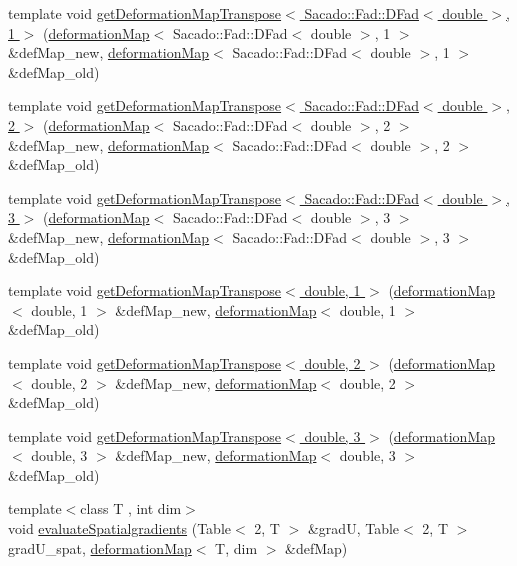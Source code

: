 \begin{DoxyCompactItemize}
\item 
template void \hyperlink{function_evaluations_8cc_a57b94bf3e5309492433be576f3e57c03}{get\-Deformation\-Map\-Transpose$<$ Sacado\-::\-Fad\-::\-D\-Fad$<$ double $>$, 1 $>$} (\hyperlink{structdeformation_map}{deformation\-Map}$<$ Sacado\-::\-Fad\-::\-D\-Fad$<$ double $>$, 1 $>$ \&def\-Map\-\_\-new, \hyperlink{structdeformation_map}{deformation\-Map}$<$ Sacado\-::\-Fad\-::\-D\-Fad$<$ double $>$, 1 $>$ \&def\-Map\-\_\-old)
\item 
template void \hyperlink{function_evaluations_8cc_a4ddf5fdc58a19c93899099e38e4a2125}{get\-Deformation\-Map\-Transpose$<$ Sacado\-::\-Fad\-::\-D\-Fad$<$ double $>$, 2 $>$} (\hyperlink{structdeformation_map}{deformation\-Map}$<$ Sacado\-::\-Fad\-::\-D\-Fad$<$ double $>$, 2 $>$ \&def\-Map\-\_\-new, \hyperlink{structdeformation_map}{deformation\-Map}$<$ Sacado\-::\-Fad\-::\-D\-Fad$<$ double $>$, 2 $>$ \&def\-Map\-\_\-old)
\item 
template void \hyperlink{function_evaluations_8cc_afa134cc0a430399a7c20d2d82dd652bb}{get\-Deformation\-Map\-Transpose$<$ Sacado\-::\-Fad\-::\-D\-Fad$<$ double $>$, 3 $>$} (\hyperlink{structdeformation_map}{deformation\-Map}$<$ Sacado\-::\-Fad\-::\-D\-Fad$<$ double $>$, 3 $>$ \&def\-Map\-\_\-new, \hyperlink{structdeformation_map}{deformation\-Map}$<$ Sacado\-::\-Fad\-::\-D\-Fad$<$ double $>$, 3 $>$ \&def\-Map\-\_\-old)
\item 
template void \hyperlink{function_evaluations_8cc_a7e7354d28657df00b72c866eccede24a}{get\-Deformation\-Map\-Transpose$<$ double, 1 $>$} (\hyperlink{structdeformation_map}{deformation\-Map}$<$ double, 1 $>$ \&def\-Map\-\_\-new, \hyperlink{structdeformation_map}{deformation\-Map}$<$ double, 1 $>$ \&def\-Map\-\_\-old)
\item 
template void \hyperlink{function_evaluations_8cc_a06a40fe8ccce6ea8a8005e65e4495a90}{get\-Deformation\-Map\-Transpose$<$ double, 2 $>$} (\hyperlink{structdeformation_map}{deformation\-Map}$<$ double, 2 $>$ \&def\-Map\-\_\-new, \hyperlink{structdeformation_map}{deformation\-Map}$<$ double, 2 $>$ \&def\-Map\-\_\-old)
\item 
template void \hyperlink{function_evaluations_8cc_a867f90eaceee3244d8e5fd5692fe0117}{get\-Deformation\-Map\-Transpose$<$ double, 3 $>$} (\hyperlink{structdeformation_map}{deformation\-Map}$<$ double, 3 $>$ \&def\-Map\-\_\-new, \hyperlink{structdeformation_map}{deformation\-Map}$<$ double, 3 $>$ \&def\-Map\-\_\-old)
\item 
{\footnotesize template$<$class T , int dim$>$ }\\void \hyperlink{group___evaluation_functions_gadb862d9530a60b8ce5255222778ceeb6}{evaluate\-Spatialgradients} (Table$<$ 2, T $>$ \&grad\-U, Table$<$ 2, T $>$ grad\-U\-\_\-spat, \hyperlink{structdeformation_map}{deformation\-Map}$<$ T, dim $>$ \&def\-Map)

\end{DoxyCompactItemize}
